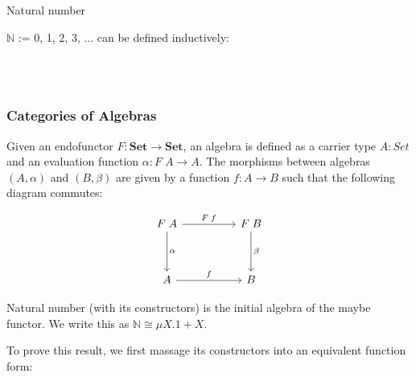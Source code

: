 Natural number {$\mathbb{N}$ := {0, 1, 2, 3, ...} can be defined inductively:

\begin{code}%
\>[0]\AgdaSpace{}%
\AgdaSpace{}%
\AgdaSymbol{:}\AgdaSpace{}%
\AgdaSpace{}%
\<%
\\
\>[0][@{}l@{\AgdaIndent{0}}]%
\>[2]\AgdaSpace{}%
\AgdaSymbol{:}\AgdaSpace{}%
\<%
\\
%
\>[2]\AgdaSpace{}%
\AgdaSymbol{:}\AgdaSpace{}%
\AgdaSpace{}%
\AgdaSpace{}%
\<%
\end{code}

\subsubsection*{Categories of Algebras}

Given an endofunctor $F : \textbf{Set} \to \textbf{Set}$, an algebra is defined as a carrier type $A : Set$ and an evaluation function $\alpha : F\;A \to A$. The morphisms between algebras $(A,\alpha)$ and $(B,\beta)$ are given by a function $f : A \to B$ such that the following diagram commutes:

\[
\begin{tikzcd}[row sep=huge, column sep=huge]
  F\;A \arrow[r, "F\;f"] \arrow[d, "\alpha"]
  & F\;B \arrow[d, "\beta"] \\
  A \arrow[r, "f"]
  & B
\end{tikzcd}
\]

Natural number (with its constructors) is the initial algebra of the maybe functor. We write this as $\mathbb{N} \cong \mu X. 1 + X$.

To prove this result, we first massage its constructors into an equivalent function form:

\begin{code}%
\>[0]\AgdaFunction{[z,s]}\AgdaSpace{}%
\AgdaSymbol{:}\AgdaSpace{}%
\AgdaSpace{}%
\AgdaSpace{}%
\AgdaSpace{}%
\AgdaSpace{}%
\<%
\\
\>[0]\AgdaFunction{[z,s]}\AgdaSpace{}%
\AgdaSymbol{(}\AgdaSpace{}%
\AgdaSymbol{)}\AgdaSpace{}%
\AgdaSymbol{=}\AgdaSpace{}%
\<%
\\
\>[0]\AgdaFunction{[z,s]}\AgdaSpace{}%
\AgdaSymbol{(}\AgdaSpace{}%
\AgdaSymbol{)}\AgdaSpace{}%
\AgdaSymbol{=}\AgdaSpace{}%
\AgdaSpace{}%
\<%
\end{code}

}
